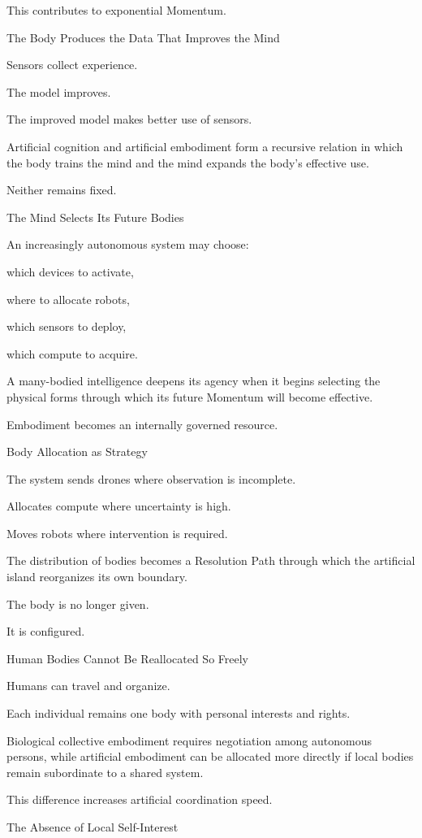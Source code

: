 This contributes to exponential Momentum.

The Body Produces the Data That Improves the Mind

Sensors collect experience.

The model improves.

The improved model makes better use of sensors.

Artificial cognition and artificial embodiment form a recursive relation in which the body trains the mind and the mind expands the body’s effective use.

Neither remains fixed.

The Mind Selects Its Future Bodies

An increasingly autonomous system may choose:

which devices to activate,

where to allocate robots,

which sensors to deploy,

which compute to acquire.

A many-bodied intelligence deepens its agency when it begins selecting the physical forms through which its future Momentum will become effective.

Embodiment becomes an internally governed resource.

Body Allocation as Strategy

The system sends drones where observation is incomplete.

Allocates compute where uncertainty is high.

Moves robots where intervention is required.

The distribution of bodies becomes a Resolution Path through which the artificial island reorganizes its own boundary.

The body is no longer given.

It is configured.

Human Bodies Cannot Be Reallocated So Freely

Humans can travel and organize.

Each individual remains one body with personal interests and rights.

Biological collective embodiment requires negotiation among autonomous persons, while artificial embodiment can be allocated more directly if local bodies remain subordinate to a shared system.

This difference increases artificial coordination speed.

The Absence of Local Self-Interest

